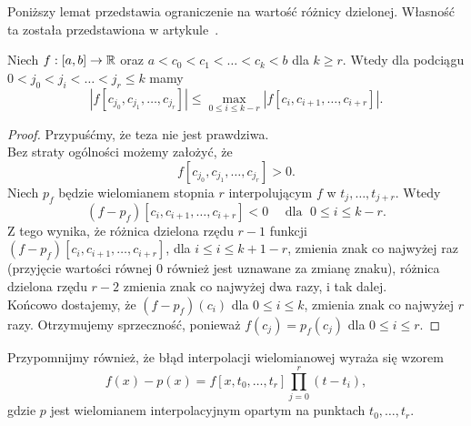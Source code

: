 \documentclass[oik, pdftex, man]{mgrwms}
\begin{document}
    Poniższy lemat przedstawia ograniczenie na wartość różnicy dzielonej. Własność ta została przedstawiona w artykule~\cite{UA}.
    \begin{lemma} \label{lem:4:wlasnosc_roznic_dzielonych_z_art_2009}
        Niech $f: [a,b] \rightarrow \mathbb{R}$ oraz $a < c_{0} <  c_{1} < \ldots < c_{k} < b$ dla $k \geq r$. Wtedy dla podciągu $0 < j_{0} < j_{i} < \ldots < j_{r} \leq k$ mamy
        \begin{equation*}
            \left| f[c_{j_{0}}, c_{j_{1}}, \ldots, c_{j_{r}}] \right| \leq \max_{0 \leq i \leq k-r} \left| f[c_{i}, c_{i+1}, \ldots, c_{i+r}] \right|.
        \end{equation*}
    \end{lemma}
    \begin{proof}
        Przypuśćmy, że teza nie jest prawdziwa. \\
        Bez straty ogólności możemy założyć, że
        \begin{equation*}
            f[c_{j_{0}}, c_{j_{1}}, \ldots, c_{j_{r}}]> 0.
        \end{equation*}
        Niech $p_{f}$ będzie wielomianem stopnia $r$ interpolującym $f$ w $t_{j}, \ldots, t_{j+r}$. Wtedy
        \begin{equation*}
            \left( f-p_{f} \right)[c_{i}, c_{i+1}, \ldots, c_{i+r}] < 0 \quad \text{ dla }\; 0 \leq i \leq k-r.
        \end{equation*}
        Z tego wynika, że różnica dzielona rzędu $r-1$ funkcji $\left( f-p_{f} \right)[c_{i}, c_{i+1}, \ldots, c_{i+r}]$, dla $i \leq i \leq k+1-r$, zmienia znak co najwyżej raz (przyjęcie wartości równej 0 również jest uznawane za zmianę znaku), różnica dzielona rzędu $r-2$ zmienia znak co najwyżej dwa razy, i tak dalej. \\
        Końcowo dostajemy, że $(f-p_{f})(c_{i})$ dla $0 \leq i \leq k$, zmienia znak co najwyżej $r$ razy. Otrzymujemy sprzeczność, ponieważ $f(c_{j}) = p_{f}(c_{j})$ dla $0 \leq i \leq r$.

    \end{proof}

    Przypomnijmy również, że błąd interpolacji wielomianowej wyraża się wzorem
    \begin{equation*} \label{eq:34:blad_interpolacji_lagrangea}
        f(x) - p(x) = f[x, t_{0}, \ldots, t_{r}] \prod_{j = 0}^{r} (t - t_{i}),
    \end{equation*}
    gdzie $p$ jest wielomianem interpolacyjnym opartym na punktach $t_{0}, \ldots, t_{r}$.
\end{document}
